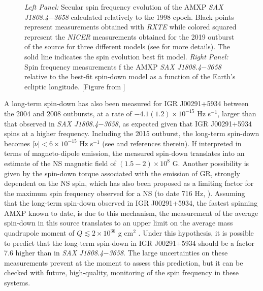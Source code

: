 \documentclass[graybox]{svmult}
\def \rxte {{\em RXTE\xspace}}
\def \saxj{{\em SAX J1808.4$-$3658\xspace}}
\def \nicer{{\em NICER\xspace}}
\begin{document}
\begin{figure}
\begin{subfigure}{.5\textwidth}
  \label{fig:sfig2}
\end{subfigure}
\caption{\textit{Left Panel:} Secular spin frequency evolution of the AMXP \saxj{} calculated relatively to the 1998 epoch. Black points represent measurements obtained with \rxte{} while colored squared represent the \nicer{} measurements obtained for the 2019 outburst of the source for three different models (see \cite{Bult2019c} for more details). The solid line indicates the spin evolution best fit model. \textit{Right Panel:} Spin frequency measurements f the AMXP \saxj{} relative to the best-fit spin-down model as a function of the Earth's ecliptic longitude. [Figure from \cite{Bult2019c}]}
\label{fig:1808_sec}
\end{figure}

A long-term spin-down has also been measured for IGR J00291+5934 between the 2004 and 2008 outbursts, at a rate of $-4.1(1.2) \times 10^{-15}$ Hz s$^{-1}$, larger than that observed in \saxj{}, as expected given that IGR J00291+5934 spins at a higher frequency. Including the 2015 outburst, the long-term spin-down becomes $|\dot{\nu}|< 6\times 10^{-15}$ Hz s$^{-1}$  (see \cite{Sanna2017d} and references therein). If interpreted in terms of magneto-dipole emission, the measured spin-down translates into an estimate of the NS magnetic field of $(1.5-2) \times 10^8$ G. Another possibility is given by the spin-down torque associated with the emission of GR, strongly dependent on the NS spin, which has also been proposed as a limiting factor for the maximum spin frequency observed for a NS (to date 716 Hz, \cite{Hessels2006}). Assuming that the long-term spin-down observed in IGR J00291+5934, the fastest spinning AMXP known to date, is due to this mechanism, the measurement of the average spin-down in this source translates to an upper limit on the average mass quadrupole moment of $Q \lesssim 2 \times 10^{36}$ g cm$^2$ \cite{Hartman2011}. Under this hypothesis, it is possible to predict that the long-term spin-down in IGR J00291+5934 should be a factor 7.6 higher than in \saxj{}. The large uncertainties on these measurements prevent at the moment to assess this prediction, but it can be checked with future, high-quality, monitoring of the spin frequency in these systems.
\end{document}
